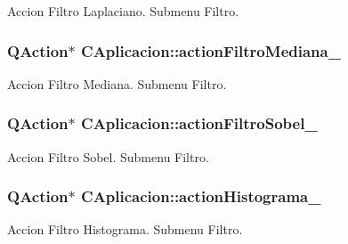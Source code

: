 Accion Filtro Laplaciano. Submenu Filtro. 

\subsubsection[{\texorpdfstring{action\+Filtro\+Mediana\+\_\+}{actionFiltroMediana_}}]{\setlength{\rightskip}{0pt plus 5cm}Q\+Action$\ast$ C\+Aplicacion\+::action\+Filtro\+Mediana\+\_\+\hspace{0.3cm}{\ttfamily [private]}}\hypertarget{classCAplicacion_a7121918f17fc9640c91f26961f7ee221}{}\label{classCAplicacion_a7121918f17fc9640c91f26961f7ee221}


Accion Filtro Mediana. Submenu Filtro. 

\subsubsection[{\texorpdfstring{action\+Filtro\+Sobel\+\_\+}{actionFiltroSobel_}}]{\setlength{\rightskip}{0pt plus 5cm}Q\+Action$\ast$ C\+Aplicacion\+::action\+Filtro\+Sobel\+\_\+\hspace{0.3cm}{\ttfamily [private]}}\hypertarget{classCAplicacion_a96511c94f6a4a6da0466d460272f56bf}{}\label{classCAplicacion_a96511c94f6a4a6da0466d460272f56bf}


Accion Filtro Sobel. Submenu Filtro. 

\subsubsection[{\texorpdfstring{action\+Histograma\+\_\+}{actionHistograma_}}]{\setlength{\rightskip}{0pt plus 5cm}Q\+Action$\ast$ C\+Aplicacion\+::action\+Histograma\+\_\+\hspace{0.3cm}{\ttfamily [private]}}\hypertarget{classCAplicacion_a60f0707037ad02949ff17858729faff2}{}\label{classCAplicacion_a60f0707037ad02949ff17858729faff2}


Accion Filtro Histograma. Submenu Filtro. 

